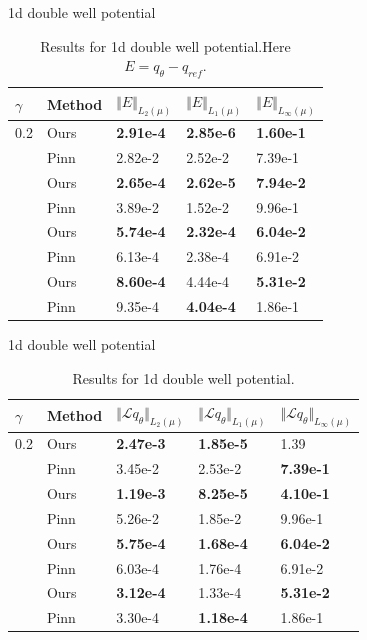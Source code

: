 \documentclass{beamer}
\begin{document}
\begin{frame}{1d double well potential}
    \begin{table}
  \centering
  \caption{Results for 1d double well potential.Here $E = q_\theta - q_{ref}$.}
  \label{tab:1d_E}
  \begin{tabular}{@{} l l l l l @{}}
    \toprule
    $\gamma$ & Method & $\Vert E \Vert_{L_2(\mu)}$ & $\Vert E \Vert_{L_1(\mu)}$ & $\Vert E \Vert_{L_{\infty}(\mu)}$ \\
    \midrule
    0.2 & Ours & \textbf{2.91e-4} & \textbf{2.85e-6} & \textbf{1.60e-1} \\
         & Pinn & 2.82e-2 & 2.52e-2 & 7.39e-1 \\
    \addlinespace
    1   & Ours & \textbf{2.65e-4} & \textbf{2.62e-5} & \textbf{7.94e-2} \\
         & Pinn & 3.89e-2 & 1.52e-2 & 9.96e-1 \\
    \addlinespace
    5   & Ours & \textbf{5.74e-4} & \textbf{2.32e-4} & \textbf{6.04e-2} \\
         & Pinn & 6.13e-4 & 2.38e-4 & 6.91e-2 \\
    \addlinespace
    25  & Ours & \textbf{8.60e-4} & 4.44e-4 & \textbf{5.31e-2} \\
         & Pinn & 9.35e-4 & \textbf{4.04e-4} & 1.86e-1 \\
    \bottomrule
  \end{tabular}
\end{table}
\end{frame}

\begin{frame}{1d double well potential}
    \begin{table}
  \centering
  \caption{Results for 1d double well potential. }
  \label{tab:1d_Lq}
  \begin{tabular}{@{} l l l l l @{}}
    \toprule
    $\gamma$ & Method & $\Vert \mathcal{L} q_\theta \Vert_{L_2(\mu)}$ & $\Vert \mathcal{L} q_\theta \Vert_{L_1(\mu)}$ & $\Vert \mathcal{L} q_\theta \Vert_{L_{\infty}(\mu)}$ \\
    \midrule
    0.2 & Ours & \textbf{2.47e-3} & \textbf{1.85e-5} & 1.39 \\
         & Pinn & 3.45e-2 & 2.53e-2 & \textbf{7.39e-1} \\
    \addlinespace
    1   & Ours & \textbf{1.19e-3} & \textbf{8.25e-5} & \textbf{4.10e-1} \\
         & Pinn & 5.26e-2 & 1.85e-2 & 9.96e-1 \\
    \addlinespace
    5   & Ours & \textbf{5.75e-4} & \textbf{1.68e-4} & \textbf{6.04e-2} \\
         & Pinn & 6.03e-4 & 1.76e-4 & 6.91e-2 \\
    \addlinespace
    25  & Ours & \textbf{3.12e-4} & 1.33e-4 & \textbf{5.31e-2} \\
         & Pinn & 3.30e-4 & \textbf{1.18e-4} & 1.86e-1 \\
    \bottomrule
  \end{tabular}
\end{table}
\end{frame}
\end{document}

